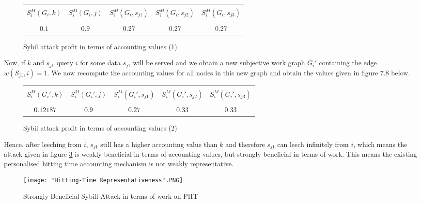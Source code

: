 \begin{example}[]
\begin{figure}[H]
\begin{center}
\begin{tabular}{|c|c|c|c|c|}
\hline & & & & \\[-0.8ex]
$S^M_i(G_i,k)$ & $S^M_i(G_i,j)$ & $S^M_i(G_i,s_{j1})$ & $S^M_i(G_i,s_{j2})$ & $S^M_i(G_i,s_{j3})$ \\[1.5ex] \hline & & & & \\[-0.8ex]
$0.1$ & $0.9$ & $0.27$ & $0.27$ & $0.27$ \\[1ex] \hline 
\end{tabular}
\label{fig:Sybil attack profit in terms of accounting values (1)}
\caption{Sybil attack profit in terms of accounting values (1)}
\end{center}
\end{figure}

\noindent{}Now, if $k$ and $s_{j1}$ query $i$ for some data $s_{j1}$ will be served and we obtain a new subjective work graph $G_i'$ containing the edge $w(S_{j1},i)=1$. We now recompute the accounting values for all nodes in this new graph and obtain the values given in figure 7.8 below.

\begin{figure}[H]
\begin{center}
\begin{tabular}{|c|c|c|c|c|}
\hline & & & & \\[-0.8ex]
$S^M_i(G_i',k)$ & $S^M_i(G_i',j)$ & $S^M_i(G_i',s_{j1})$ & $S^M_i(G_i',s_{j2})$ & $S^M_i(G_i',s_{j3})$ \\[1.5ex] \hline & & & & \\[-0.8ex]
$0.12187$ & $0.9$ & $0.27$ & $0.33$ & $0.33$ \\[1ex] \hline 
\end{tabular}
\label{fig:Sybil attack profit in terms of accounting values (2)}
\caption{Sybil attack profit in terms of accounting values (2)}
\end{center}
\end{figure}

\noindent{}Hence, after leeching from $i$, $s_{j1}$ still has a higher accounting value than $k$ and therefore $s_{j1}$ can leech infinitely from $i$, which means the attack given in figure \ref{fig:Hitting Time Representativeness} is weakly beneficial in terms of accounting values, but strongly beneficial in terms of work. This means the existing personalised hitting time accounting mechanism is not weakly representative.

\begin{figure}[H]
\begin{center}
\texttt{[image: "Hitting-Time Representativeness".PNG]}
\caption{Strongly Beneficial Sybill Attack in terms of work on PHT}
\label{fig:Hitting Time Representativeness}
\end{center}
\end{figure}


\end{example}
